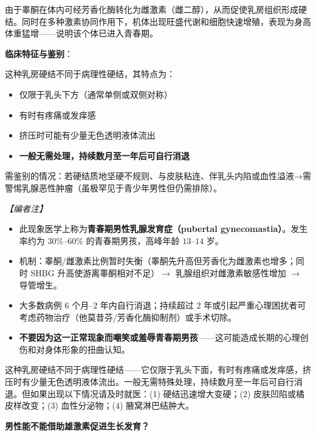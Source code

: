 由于睾酮在体内可经芳香化酶转化为雌激素（雌二醇），从而促使乳房组织形成硬结。同时在多种激素协同作用下，机体出现旺盛代谢和细胞快速增殖，表现为身高体重猛增——说明该个体已进入青春期。

\vspace{0.5em}
\noindent\textbf{临床特征与鉴别}：

这种乳房硬结不同于病理性硬结，其特点为：
\begin{itemize}
	\item 仅限于乳头下方（通常单侧或双侧对称）
	\item 有时有疼痛或发痒感
	\item 挤压时可能有少量无色透明液体流出
	\item \textbf{一般无需处理，持续数月至一年后可自行消退}
\end{itemize}

需鉴别的情况：若硬结质地坚硬不规则、与皮肤粘连、伴乳头内陷或血性溢液→需警惕乳腺恶性肿瘤（虽极罕见于青少年男性但仍需排除）。

\vspace{0.5em}
\noindent\textit{【编者注】}
\begin{itemize}
	\item 此现象医学上称为\textbf{青春期男性乳腺发育症（pubertal gynecomastia）}。发生率约为 $30\%$--$60\%$ 的青春期男孩，高峰年龄 $13$--$14$ 岁。
	\item 机制：睾酮/雌激素比例暂时失衡（睾酮先升高但芳香化为雌激素也增多；同时 SHBG 升高使游离睾酮相对不足）$\rightarrow$ 乳腺组织对雌激素敏感性增加 $\rightarrow$ 导管增生。
	\item 大多数病例 $6$ 个月--$2$ 年内自行消退；持续超过 2 年或引起严重心理困扰者可考虑药物治疗（他莫昔芬/芳香化酶抑制剂）或手术切除。
	\item \textbf{不要因为这一正常现象而嘲笑或羞辱青春期男孩}——这可能造成长期的心理创伤和对身体形象的扭曲认知。
\end{itemize}

\begin{tcolorbox}[colback=pink!5!white,colframe=red!50!black,title=贴心小叮咛]
这种乳房硬结不同于病理性硬结——它仅限于乳头下面，有时有疼痛或发痒感，挤压时有少量无色透明液体流出。一般无需特殊处理，持续数月至一年后可自行消退。但如果出现以下情况请及时就医：(1) 硬结迅速增大变硬；(2) 皮肤凹陷或橘皮样改变；(3) 血性分泌物；(4) 腋窝淋巴结肿大。
\end{tcolorbox}

\vspace{0.8em}
\noindent\textbf{男性能不能借助雄激素促进生长发育？}

